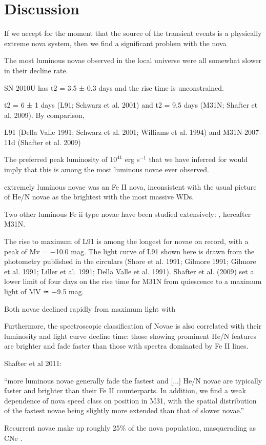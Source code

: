 \section{Discussion}
\label{sec:Discussion}



If we accept for the moment that the source of the \spock transient
events is a physically extreme nova system, then we find a significant
problem with the nova

The most luminous novae observed in the local
universe were all somewhat slower in their decline rate.

SN 2010U has t2 = 3.5 ± 0.3 days and the rise time is unconstrained.

t2 = 6 ± 1 days (L91; Schwarz et al. 2001) and t2 = 9.5 days (M31N; Shafter et al. 2009). By comparison, 

L91 (Della Valle 1991; Schwarz et al. 2001; Williams et al. 1994) and M31N-2007-11d (Shafter et al. 2009)

The preferred peak luminosity of
$10^{41}$ erg s$^{-1}$ that we have inferred for \spock would imply
that this is among the most luminous novae ever observed.



extremely luminous novae \citep{Czekala:2013}
was an Fe II nova, inconsistent with the usual picture of He/N novae as the brightest with the most massive WDs.

Two other luminous Fe ii type novae have been studied extensively: , hereafter M31N.

The rise to maximum of L91 is among the longest for novae on record, with a peak of Mv = −10.0 mag. The light curve of L91 shown here is drawn from the photometry published in the circulars (Shore et al. 1991; Gilmore 1991; Gilmore et al. 1991; Liller et al. 1991; Della Valle et al. 1991). Shafter et al. (2009) set a lower limit of four days on the rise time for M31N from quiescence to a maximum light of MV ≃ −9.5 mag.

Both novae declined rapidly from maximum light with 



Furthermore, the spectroscopic classification
of Novae is also correlated with their luminosity and light curve
decline time: those showing prominent He/N features are brighter and
fade faster than those with spectra dominated by Fe II lines.


Shafter et al 2011:

``more luminous novae generally fade the fastest and [...]  He/N novae
are typically faster and brighter than their Fe II counterparts. In
addition, we find a weak dependence of nova speed class on position in
M31, with the spatial distribution of the fastest novae being slightly
more extended than that of slower novae.''


Recurrent novae make up roughly 25\% of the nova population,
masquerading as CNe \citep{Pagnotta:2014}.
